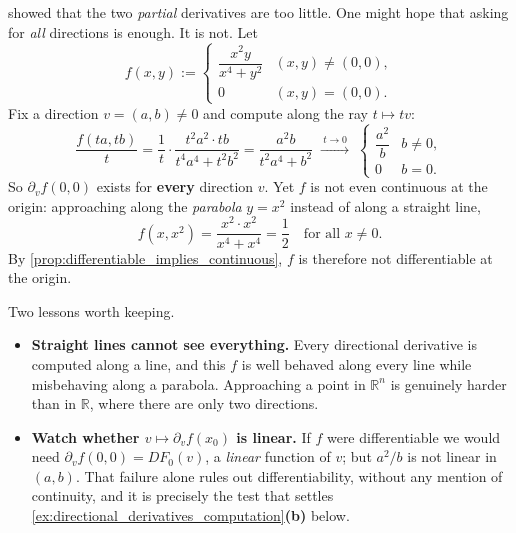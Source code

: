 \begin{aiexample}
\label{ex:all_directional_derivatives_exist}
 showed that the two \emph{partial} derivatives are
too little. One might hope that asking for \emph{all} directions is enough. It is not. Let
\[f(x,y) := \begin{cases} \dfrac{x^2y}{x^4+y^2} & (x,y) \neq (0,0), \\[1ex] 0 & (x,y)=(0,0).\end{cases}\]
Fix a direction $v = (a,b) \neq 0$ and compute along the ray $t \mapsto tv$:
\[\frac{f(ta,tb)}{t} = \frac{1}{t}\cdot\frac{t^2a^2\cdot tb}{t^4a^4+t^2b^2}
   = \frac{a^2b}{t^2a^4+b^2} \;\xrightarrow{\ t\to0\ }\;
   \begin{cases} \dfrac{a^2}{b} & b \neq 0, \\[1ex] 0 & b = 0.\end{cases}\]
So $\partial_vf(0,0)$ exists for \textbf{every} direction $v$. Yet $f$ is not even continuous at
the origin: approaching along the \emph{parabola} $y=x^2$ instead of along a straight line,
\[f(x,x^2) = \frac{x^2\cdot x^2}{x^4+x^4} = \frac12 \quad\text{for all } x \neq 0.\]
By \cref{prop:differentiable_implies_continuous}, $f$ is therefore not differentiable at the
origin.

Two lessons worth keeping.
\begin{itemize}
  \item \textbf{Straight lines cannot see everything.} Every directional derivative is computed
    along a line, and this $f$ is well behaved along every line while misbehaving along a
    parabola. Approaching a point in $\mathbb{R}^n$ is genuinely harder than in $\mathbb{R}$,
    where there are only two directions.
  \item \textbf{Watch whether $v \mapsto \partial_vf(x_0)$ is linear.} If $f$ were differentiable
    we would need $\partial_vf(0,0) = DF_0(v)$, a \emph{linear} function of $v$; but $a^2/b$ is
    not linear in $(a,b)$. That failure alone rules out differentiability, without any mention of
    continuity, and it is precisely the test that settles \cref{ex:directional_derivatives_computation}\textbf{(b)} below.
\end{itemize}
\end{aiexample}




